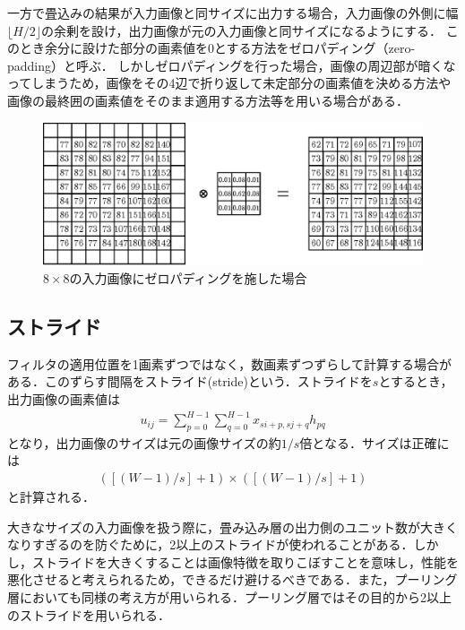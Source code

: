 \documentclass[a4paper,10pt]{jsarticle}
\begin{document}
一方で畳込みの結果が入力画像と同サイズに出力する場合，入力画像の外側に幅$\lfloor H/2\rfloor$の余剰を設け，出力画像が元の入力画像と同サイズになるようにする．
このとき余分に設けた部分の画素値を0とする方法をゼロパディング（zero-padding）と呼ぶ．
しかしゼロパディングを行った場合，画像の周辺部が暗くなってしまうため，画像をその4辺で折り返して未定部分の画素値を決める方法や画像の最終囲の画素値をそのまま適用する方法等を用いる場合がある．
\begin{figure}[t]
  \begin{center}
    \includegraphics[clip,scale=0.8]{fig/eps/zero_padding.eps}
  \end{center}
  \caption{$8\times 8$の入力画像にゼロパディングを施した場合}
  \label{fig:88の入力画像にゼロパディングを施した場合}
\end{figure}

\subsection{ストライド}
フィルタの適用位置を1画素ずつではなく，数画素ずつずらして計算する場合がある．このずらす間隔をストライド(stride)という．ストライドを$s$とするとき，出力画像の画素値は
\begin{eqnarray}
 u_{ij} = \sum^{H-1}_{p=0}\sum^{H-1}_{q=0} x_{si+p,sj+q}h_{pq}
\end{eqnarray}
となり，出力画像のサイズは元の画像サイズの約$1/s$倍となる．サイズは正確には
\begin{eqnarray}
 \left(\left[\left(W-1\right)/s\right]+1\right)\times \left(\left[\left(W-1\right)/s\right]+1\right)
\end{eqnarray}
と計算される．

大きなサイズの入力画像を扱う際に，畳み込み層の出力側のユニット数が大きくなりすぎるのを防ぐために，2以上のストライドが使われることがある．しかし，ストライドを大きくすることは画像特徴を取りこぼすことを意味し，性能を悪化させると考えられるため，できるだけ避けるべきである．また，プーリング層においても同様の考え方が用いられる．プーリング層ではその目的から2以上のストライドを用いられる．
\end{document}
